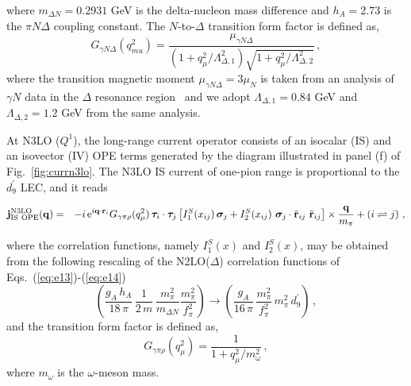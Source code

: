 \documentclass[aps,prc,floatfix,showpacs,twocolumn, preprintnumbers]{revtex4-2}
\begin{document}
where $m_{\Delta N}=0.2931$ GeV is the delta-nucleon mass difference and $h_A=2.73$ is the $\pi N\Delta$ coupling constant.  The $N$-to-$\Delta$ transition form factor is defined as,
\begin{equation}
G_{\gamma N \Delta}(q_{mu}^2) = \frac{\mu_{\gamma N \Delta}}{(1 + q_{\mu}^2/\Lambda_{\Delta,1}^2)\sqrt{1+q_{\mu}^2/\Lambda_{\Delta,2}^2}}\, ,
\end{equation}
where the transition magnetic moment $\mu_{\gamma N \Delta} = 3 \mu_N$ is taken from an analysis of $\gamma N$ data in the $\Delta$ resonance region~\cite{Carlson:1985mm} and we adopt $\Lambda_{\Delta,1}=0.84$ GeV and $\Lambda_{\Delta,2}=1.2$ GeV from the same analysis.

At N3LO ($Q^1$), the long-range current operator consists of an isocalar (IS) and an isovector (IV) OPE terms generated by the diagram illustrated in panel (f) of Fig.~\ref{fig:currn3lo}. The N3LO IS current of one-pion range is proportional to the $d_9^\prime$ LEC, and it reads
\begin{widetext}
\begin{eqnarray}
{\bf j}^{\rm N3LO}_{\rm IS~OPE}({\bf q})&=&-i\,{\rm e}^{i {\bf q}\cdot {\bf r}_i} G_{\gamma \pi \rho}(q_{\mu}^2)\,  {\bm \tau}_i\cdot{\bm \tau}_j
\left[ I^S_1(x_{ij}) \, {\bm \sigma}_j
+I^S_2(x_{ij}) \,\,
 {\bm \sigma}_j\cdot \hat{\bf r}_{ij} \,\, \hat{\bf r}_{ij}\right]\times 
 \frac{{\bf q}}{m_\pi}+(i\rightleftharpoons j )\ ,
 \label{eq:n3lo.is} 
\end{eqnarray}
\end{widetext}
where the correlation functions, namely $I^S_1(x)$ and $I^S_2(x)$,  may be obtained from the following rescaling of the N2LO($\Delta$) correlation functions of Eqs.~(\ref{eq:e13})-(\ref{eq:e14}) 
\begin{equation}
\left(\frac{g_A\,h_A}{18\, \pi}\,
\frac{1}{2\, m}\, \frac{m_\pi^2}{m_{\Delta N}}
 \frac{m_\pi^2}{f_\pi^2}\right) 
 \longrightarrow \left(\frac{g_A}{16\, \pi}\,
 \frac{m_\pi^2}{f_\pi^2}\, m_\pi^2\, d_9^\prime \right) \, , \nonumber
\end{equation}
and the transition form factor is defined as,
\begin{equation}
G_{\gamma \pi \rho}(q_{\mu}^2) = \frac{1}{1+q_{\mu}^2/m_{\omega}^2}\, ,
\end{equation}
where $m_{\omega}$ is the $\omega$-meson mass. 
\end{document}
